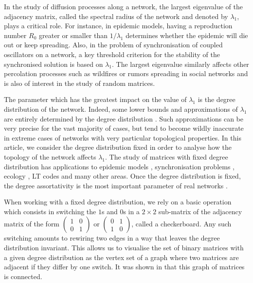 \documentclass{article}
\renewcommand{\ll}{\lambda_1}
\begin{document}
In the study of diffusion processes along a network, the largest eigenvalue  of the adjacency matrix, called the spectral radius of the network and denoted by $\ll$, plays a critical role. For instance, in epidemic models, having a reproduction number $R_0$ greater or smaller than $1/\ll$ determines whether the epidemic will die out or keep spreading. Also, in the problem of synchronisation of coupled oscillators on a network, a key threshold criterion for the stability of the synchronised solution is based on $\ll$. The largest eigenvalue similarly affects other percolation processes such as wildfires or rumors spreading in social networks and is also of interest in the study of random matrices.

The parameter which has the greatest impact on the value of $\ll$ is the degree distribution of the network. Indeed, some lower bounds and approximations of $\ll$ are entirely determined by the degree distribution \cite{restrepo2007approximating}. Such approximations can be very precise for the vast majority of cases, but tend to become wildly inaccurate in extreme cases of networks with very particular topological properties. In this article, we consider the degree distribution fixed in order to analyse how the topology of the network affects $\ll$. The study of matrices with fixed degree distribution has applications to epidemic models \cite{coupechoux2014clustering}, synchronisation problems \cite{mcgraw2005clustering},  ecology \cite{brualdi1999nested}, LT codes \cite{jiang2016degree} and many other areas. Once the degree distribution is fixed, the degree assortativity is the most important parameter of real networks \cite{xulvi2004reshuffling,newman2003}. 

When working with a fixed degree distribution, we rely on a basic operation which consists in switching the $1$s and $0$s in a $2\times 2$ sub-matrix of the adjacency matrix of the form $\begin{pmatrix}
1 & 0 \\
0 & 1
\end{pmatrix}$
or $\begin{pmatrix}
0 & 1 \\
1 & 0
\end{pmatrix}$, called a checkerboard. Any such switching amounts to rewiring two edges in a way that leaves the degree distribution invariant. This allows us to visualise the set of binary matrices with a given degree distribution as the vertex set of a graph where two matrices are adjacent if they differ by one switch. It was shown in \cite{ryser1957} that this graph of matrices is connected.
\end{document}
